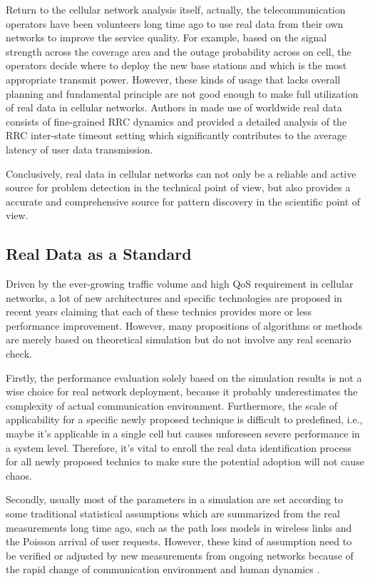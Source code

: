 {Return to the cellular network analysis itself, actually, the telecommunication operators have been volunteers long time ago to use real data from their own networks to improve the service quality. For example, based on the signal strength across the coverage area and the outage probability across on cell, the operators decide where to deploy the new base stations and which is the most appropriate transmit power. However, these kinds of usage that lacks overall planning and fundamental principle are not good enough to make full utilization of real data in cellular networks. Authors in \cite{rosen2014discovering} made use of worldwide real data consists of fine-grained RRC dynamics and provided a detailed analysis of the RRC inter-state timeout setting which significantly contributes to the average latency of user data transmission.

Conclusively, real data in cellular networks can not only be a reliable and active source for problem detection in the technical point of view, but also provides a accurate and comprehensive source for pattern discovery in the scientific point of view.

\subsection{Real Data as a Standard}
Driven by the ever-growing traffic volume and high QoS requirement in cellular networks, a lot of new architectures and specific technologies are proposed in recent years claiming that each of these technics provides more or less performance improvement. However, many propositions of algorithms or methods are merely based on theoretical simulation but do not involve any real scenario check.

Firstly, the performance evaluation solely based on the simulation results is not a wise choice for real network deployment, because it probably underestimates the complexity of actual communication environment. Furthermore, the scale of applicability for a specific newly proposed technique is difficult to predefined, i.e., maybe it's applicable in a single cell but causes unforeseen severe performance in a system level. Therefore, it's vital to enroll the real data identification process for all newly proposed technics to make sure the potential adoption will not cause chaos.

Secondly, usually most of the parameters in a simulation are set according to some traditional statistical assumptions which are summarized from the real measurements long time ago, such as the path loss models in wireless links and the Poisson arrival of user requests. However, these kind of assumption need to be verified or adjusted by new measurements from ongoing networks because of the rapid change of communication environment and human dynamics \cite{steenbruggen2013mobile}.

}
